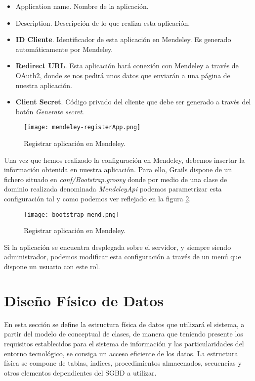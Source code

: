 \begin{itemize}
	\item Application name. Nombre de la aplicación.
	\item Description. Descripción de lo que realiza esta aplicación.
	\item \textbf{ID Cliente}. Identificador de esta aplicación en Mendeley. Es generado automáticamente por Mendeley.
	\item \textbf{Redirect URL}. Esta aplicación hará conexión con Mendeley a través de OAuth2, donde se nos pedirá unos datos que enviarán a una página de nuestra aplicación. 
	\item \textbf{Client Secret}. Código privado del cliente que debe ser generado a través del botón \textit{Generate secret}.
\end{itemize}

\begin{figure}[!hp]
	\begin{center} 
		\texttt{[image: mendeley-registerApp.png]}
		\caption{Registrar aplicación en Mendeley.}
		\label{fig:mend-register}
	\end{center}
\end{figure}

Una vez que hemos realizado la configuración en Mendeley, debemos insertar la información obtenida en nuestra aplicación. Para ello, Grails dispone de un fichero situado en \textit{conf/Bootstrap.groovy} donde por medio de una clase de dominio realizada denominada \textit{MendeleyApi} podemos parametrizar esta configuración tal y como podemos ver reflejado en la figura \ref{fig:bootstrap-mend}.

\begin{figure}[!hp]
	\begin{center} 
		\texttt{[image: bootstrap-mend.png]}
		\caption{Registrar aplicación en Mendeley.}
		\label{fig:bootstrap-mend}
	\end{center}
\end{figure}

Si la aplicación se encuentra desplegada sobre el servidor, y siempre siendo administrador, podemos modificar esta configuración a través de un menú que dispone un usuario con este rol.

\section{Diseño Físico de Datos}
En esta sección se define la estructura física de datos que utilizará el sistema, a partir del modelo de conceptual de clases, de manera que teniendo presente los requisitos establecidos para el sistema de información y las particularidades del entorno tecnológico, se consiga un acceso eficiente de los datos.
La estructura física se compone de tablas, índices, procedimientos almacenados, secuencias y otros elementos dependientes del SGBD a utilizar.

